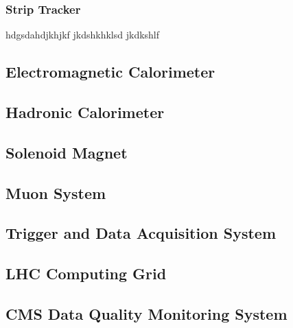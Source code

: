 \subsubsection{Strip Tracker}
hdgsdahdjkhjkf
jkdshkhklsd
jkdkshlf

\subsection{Electromagnetic Calorimeter}

\subsection{Hadronic Calorimeter}

\subsection{Solenoid Magnet}

\subsection{Muon System}

\subsection{Trigger and Data Acquisition System}

\subsection{LHC Computing Grid}

\subsection{CMS Data Quality Monitoring System}